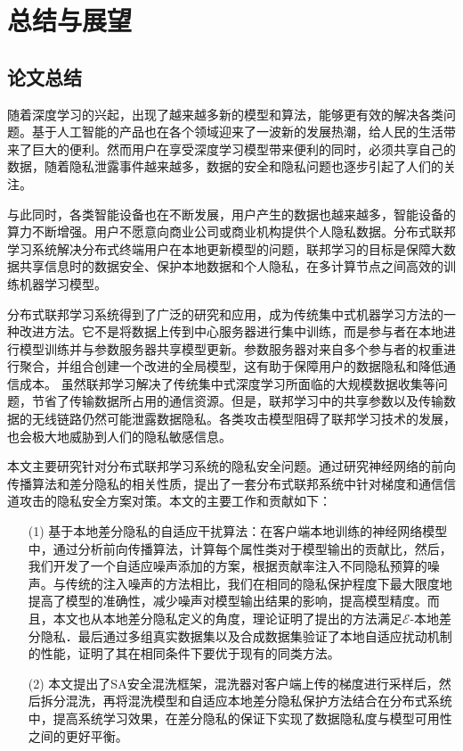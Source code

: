 \chapter{总结与展望}
\label{ch6}
\section{论文总结}
随着深度学习的兴起，出现了越来越多新的模型和算法，能够更有效的解决各类问题。基于人工智能的产品也在各个领域迎来了一波新的发展热潮，给人民的生活带来了巨大的便利。然而用户在享受深度学习模型带来便利的同时，必须共享自己的数据，随着隐私泄露事件越来越多，数据的安全和隐私问题也逐步引起了人们的关注。 

与此同时，各类智能设备也在不断发展，用户产生的数据也越来越多，智能设备的算力不断增强。用户不愿意向商业公司或商业机构提供个人隐私数据。分布式联邦学习系统解决分布式终端用户在本地更新模型的问题，联邦学习的目标是保障大数据共享信息时的数据安全、保护本地数据和个人隐私，在多计算节点之间高效的训练机器学习模型。 

分布式联邦学习系统得到了广泛的研究和应用，成为传统集中式机器学习方法的一种改进方法。它不是将数据上传到中心服务器进行集中训练，而是参与者在本地进行模型训练并与参数服务器共享模型更新。参数服务器对来自多个参与者的权重进行聚合，并组合创建一个改进的全局模型，这有助于保障用户的数据隐私和降低通信成本。 虽然联邦学习解决了传统集中式深度学习所面临的大规模数据收集等问题，节省了传输数据所占用的通信资源。但是，联邦学习中的共享参数以及传输数据的无线链路仍然可能泄露数据隐私。各类攻击模型阻碍了联邦学习技术的发展，也会极大地威胁到人们的隐私敏感信息。

本文主要研究针对分布式联邦学习系统的隐私安全问题。通过研究神经网络的前向传播算法和差分隐私的相关性质，提出了一套分布式联邦系统中针对梯度和通信信道攻击的隐私安全方案对策。本文的主要工作和贡献如下：
\begin{enumerate}
\item [(1)] 基于本地差分隐私的自适应干扰算法：在客户端本地训练的神经网络模型中，通过分析前向传播算法，计算每个属性类对于模型输出的贡献比，然后，我们开发了一个自适应噪声添加的方案，根据贡献率注入不同隐私预算的噪声。与传统的注入噪声的方法相比，我们在相同的隐私保护程度下最大限度地提高了模型的准确性，减少噪声对模型输出结果的影响，提高模型精度。而且，本文也从本地差分隐私定义的角度，理论证明了提出的方法满足$\mathcal{E}$-本地差分隐私．最后通过多组真实数据集以及合成数据集验证了本地自适应扰动机制的性能，证明了其在相同条件下要优于现有的同类方法。
\item [(2)] 本文提出了SA安全混洗框架，混洗器对客户端上传的梯度进行采样后，然后拆分混洗，再将混洗模型和自适应本地差分隐私保护方法结合在分布式系统中，提高系统学习效果，在差分隐私的保证下实现了数据隐私度与模型可用性之间的更好平衡。
\end{enumerate}


